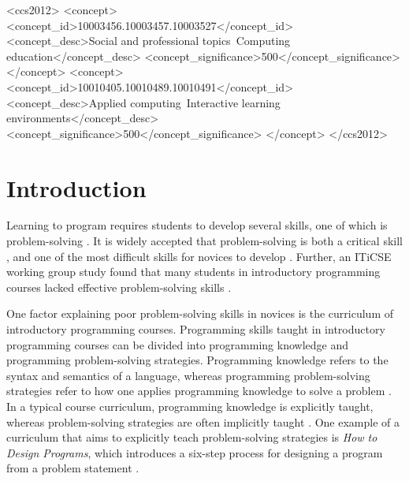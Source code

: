\documentclass[sigconf,anonymous]{acmart}
\begin{document}
\begin{CCSXML}
<ccs2012>
   <concept>
       <concept_id>10003456.10003457.10003527</concept_id>
       <concept_desc>Social and professional topics~Computing education</concept_desc>
       <concept_significance>500</concept_significance>
   </concept>
   <concept>
        <concept_id>10010405.10010489.10010491</concept_id>
        <concept_desc>Applied computing~Interactive learning environments</concept_desc>
        <concept_significance>500</concept_significance>
    </concept>
 </ccs2012>
\end{CCSXML}




\maketitle

\section{Introduction} \label{sec:introduction}
Learning to program requires students to develop several skills, one of which is problem-solving \cite{lakanen2015, bruce2003}. It is widely accepted that problem-solving is both a critical skill \cite{gomes2007}, and one of the most difficult skills for novices to develop \cite{medeiros2019}. Further, an ITiCSE working group study found that many students in introductory programming courses lacked effective problem-solving skills \cite{lister2004}.

One factor explaining poor problem-solving skills in novices is the curriculum of introductory programming courses. Programming skills taught in introductory programming courses can be divided into programming knowledge and programming problem-solving strategies. Programming knowledge refers to the syntax and semantics of a language, whereas programming problem-solving strategies refer to how one applies programming knowledge to solve a problem \cite{deraat2009}. In a typical course curriculum, programming knowledge is explicitly taught, whereas problem-solving strategies are often implicitly taught \cite{luxtonreilly2018}. One example of a curriculum that aims to explicitly teach problem-solving strategies is \emph{How to Design Programs}, which introduces a six-step process for designing a program from a problem statement \cite{felleisen2001}.
\end{document}
